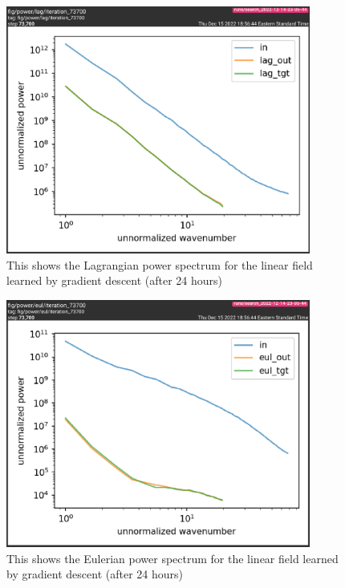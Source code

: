 \documentclass{article}
\begin{document}
\begin{figure}[h]
    \centering
    \includegraphics[width=10cm]{figs/final-lag-pow-spec.png}
    \caption{This shows the Lagrangian power spectrum for the linear field learned by gradient descent (after 24 hours)}
    \label{fig:final-lag-pow}
\end{figure}

\begin{figure}[h]
    \centering
    \includegraphics[width=10cm]{figs/final-eul-pow-spec.png}
    \caption{This shows the Eulerian power spectrum for the linear field learned by gradient descent (after 24 hours)}
    \label{fig:final-eul-pow}
\end{figure}
\end{document}
